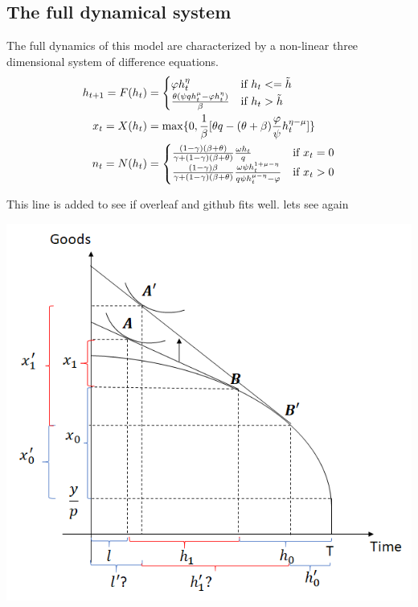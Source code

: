 \subsection{The full dynamical system} 
The full dynamics of this model are characterized by a non-linear three dimensional system of difference equations.
        \begin{equation}
    \begin{aligned}
    h_{t+1} = F(h_t)  &= \begin{cases}
                    \varphi h_{t}^{\eta}  & \text{if } h_t <= \Tilde{h} \\
                     \frac{\theta (\psi q h_{t}^{\mu} - \varphi h_{t}^{\eta})}{\beta}  & \text{if } h_t > \Tilde{h}
                     \end{cases}\\
    x_t = X(h_t)  &= \max \{0, \frac{1}{\beta}[\theta q - (\theta + \beta) \frac{\varphi}{\psi}  h_t^{\eta - \mu}]\} \\
    n_t = N(h_t)  &= \begin{cases}
                \frac{(1-\gamma)(\beta + \theta)}{\gamma + (1-\gamma)(\beta + \theta)} \frac{\omega h_t}{q} & \text{if } x_t = 0 \\
                \frac{(1-\gamma)\beta}{\gamma + (1-\gamma)(\beta + \theta)} \frac{\omega \psi h_t^{1 + \mu - \eta }}{q \psi h_t^{\mu - \eta} - \varphi}   & \text{if } x_t > 0
                 \end{cases}
    \end{aligned}
    \end{equation}

This line is added to see if overleaf and github fits well. lets see again

\includegraphics{Images/eitc_poor.png}